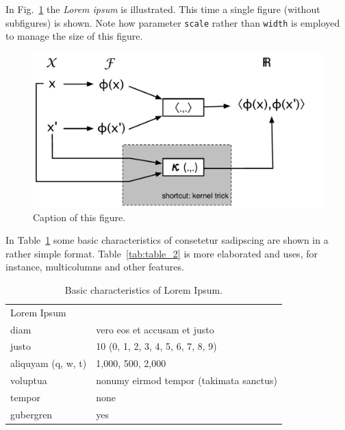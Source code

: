 In Fig.~\ref{fig:figure_2} the \textit{Lorem ipsum} is illustrated. This time a single figure (without subfigures) is shown. Note how parameter \texttt{scale} rather than \texttt{width} is employed to manage the size of this figure.


\begin{figure}
\centering
\includegraphics[scale=0.5]{img/figure}
\caption{Caption of this figure.}
\label{fig:figure_2}
\end{figure}



In Table~\ref{tab:table_1} some basic characteristics of consetetur sadipscing are shown in a rather simple format. Table~\ref{tab:table_2} is more elaborated and uses, for instance, multicolumns and other features.


\begin{table}
\centering
{
\begin{tabular}{ll}
\addlinespace
\toprule
\addlinespace
Lorem Ipsum \\
\addlinespace
\toprule
\addlinespace
diam & vero eos et accusam et justo \\
justo & 10 (0, 1, 2, 3, 4, 5, 6, 7, 8, 9) \\
aliquyam (q, w, t) &1,000, 500, 2,000\\
voluptua & nonumy eirmod tempor (takimata sanctus)\\
tempor & none \\
gubergren & yes \\
\bottomrule
\end{tabular}
}
\caption{Basic characteristics of Lorem Ipsum.}
\label{tab:table_1} 
\end{table}




